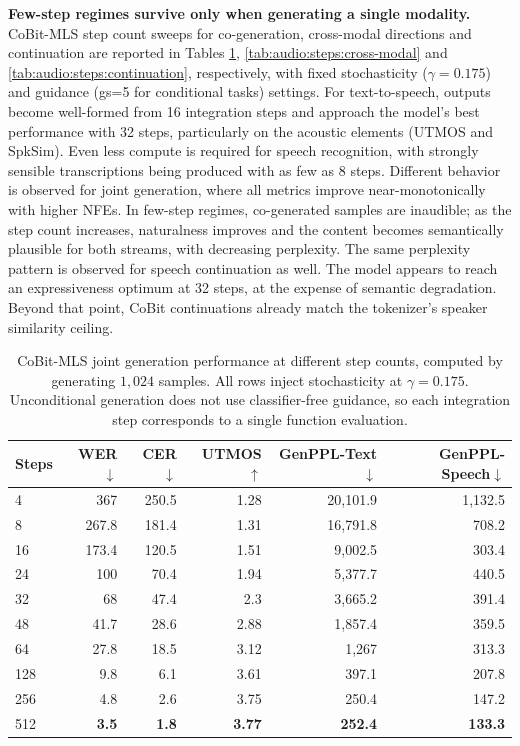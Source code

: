\textbf{Few-step regimes survive only when generating a single modality.} CoBit-MLS step count sweeps for co-generation, cross-modal directions and continuation are reported in Tables \ref{tab:audio:steps:joint}, \ref{tab:audio:steps:cross-modal} and \ref{tab:audio:steps:continuation}, respectively, with fixed stochasticity ($\gamma=0.175$) and guidance (gs=5 for conditional tasks) settings. For text-to-speech, outputs become well-formed from 16 integration steps and approach the model's best performance with 32 steps, particularly on the acoustic elements (UTMOS and SpkSim). Even less compute is required for speech recognition, with strongly sensible transcriptions being produced with as few as 8 steps. Different behavior is observed for joint generation, where all metrics improve near-monotonically with higher NFEs. In few-step regimes, co-generated samples are inaudible; as the step count increases, naturalness improves and the content becomes semantically plausible for both streams, with decreasing perplexity. The same perplexity pattern is observed for speech continuation as well. The model appears to reach an expressiveness optimum at 32 steps, at the expense of semantic degradation. Beyond that point, CoBit continuations already match the tokenizer's speaker similarity ceiling.

\begin{table}[t]
\centering
\small
\setlength{\tabcolsep}{4.5pt}
\begin{tabular}{lrrrrr}
\toprule
\textbf{Steps} & \textbf{WER}$\downarrow$ & \textbf{CER}$\downarrow$ & \textbf{UTMOS}$\uparrow$ & \textbf{GenPPL-Text}$\downarrow$ & \textbf{GenPPL-Speech}$\downarrow$ \\
\midrule
4 & 367 & 250.5 & 1.28 & 20{,}101.9 & 1{,}132.5 \\
8 & 267.8 & 181.4 & 1.31 & 16{,}791.8 & 708.2 \\
16 & 173.4 & 120.5 & 1.51 & 9{,}002.5 & 303.4 \\
24 & 100 & 70.4 & 1.94 & 5{,}377.7 & 440.5 \\
32 & 68 & 47.4 & 2.3 & 3{,}665.2 & 391.4\\
48 & 41.7 & 28.6 & 2.88 & 1{,}857.4 & 359.5\\
64 & 27.8 & 18.5 & 3.12 & 1{,}267 & 313.3 \\
128 & 9.8 & 6.1 & 3.61 & 397.1 & 207.8 \\
256 & 4.8 & 2.6 & 3.75 & 250.4 & 147.2 \\
512 & \textbf{3.5} & \textbf{1.8} & \textbf{3.77} & \textbf{252.4} & \textbf{133.3} \\
\bottomrule
\end{tabular}
\caption{CoBit-MLS joint generation performance at different step counts, computed by generating $1,024$ samples. All rows inject stochasticity at $\gamma=0.175$. Unconditional generation does not use classifier-free guidance, so each integration step corresponds to a single function evaluation.}
\label{tab:audio:steps:joint}
\end{table}

